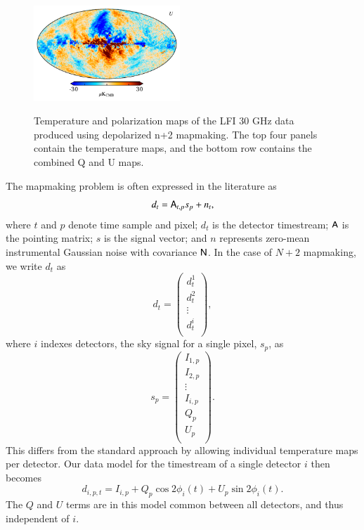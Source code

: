 \documentclass{aa}
\newcommand{\A}[0]{\tens{A}}
\newcommand{\N}[0]{\tens{N}}
\begin{document}
\begin{figure}[!]
  \includegraphics[width=0.49\textwidth]{figs/map_U_depol.pdf}\\
  \caption{Temperature and polarization maps of the LFI 30 GHz data produced using depolarized n+2 mapmaking. The top four panels contain the temperature maps, and the bottom row contains the combined Q and U maps.}
  \label{fig:depolarized}
\end{figure}

The mapmaking problem is often expressed in the literature as \citep[e.g.,][]{de_Gasperis_2005}
\begin{equation}
d_t = \A_{t,p}s_p + n_t,
\end{equation}
where $t$ and $p$ denote time sample and pixel; $d_t$ is the detector timestream; $\A$ is the pointing matrix; $s$ is the signal vector; and $n$ represents zero-mean instrumental Gaussian noise with covariance $\N$. In the case of $N+2$ mapmaking, we write $d_t$ as 
\begin{equation}
d_t = \begin{pmatrix}
d_t^1\\ d_t^2\\ \vdots \\ d_t^i\\
\end{pmatrix},
\end{equation}
where $i$ indexes detectors, the sky signal for a single pixel, $s_p$, as
\begin{equation}
s_p = \begin{pmatrix}
I_{1,p}\\
I_{2,p}\\
\vdots\\
I_{i,p}\\
Q_p\\
U_p\\
\end{pmatrix}.
\end{equation}
This differs from the standard approach by allowing individual temperature maps per detector. Our data model for the timestream of a single detector $i$ then becomes
\begin{equation}
d_{i,p,t} = I_{i,p} + Q_p \cos2\phi_i(t) + U_p \sin2\phi_i(t).
\label{eq:datamodel}
\end{equation}
The $Q$ and $U$ terms are in this model common between all detectors, and thus independent of $i$.
\end{document}
